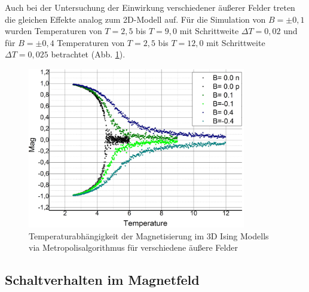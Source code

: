 Auch bei der Untersuchung der Einwirkung verschiedener äußerer Felder treten die gleichen Effekte analog zum 2D-Modell auf. Für die Simulation von $B=\pm 0,1$ wurden Temperaturen von $T=2,5$ bis $T=9,0$ mit Schrittweite $\Delta T= 0,02$ und für $B=\pm 0,4$ Temperaturen von $T=2,5$ bis $T=12,0$ mit Schrittweite $\Delta T= 0,025$ betrachtet (Abb. \ref{mp3db}).
 \begin{figure}[H]
	\centering
	\includegraphics[width=0.85\textwidth]{../Graph_Export/MP3D/m(T)_MP3D_Plot.jpg}	
	\caption{Temperaturabhängigkeit der Magnetisierung im 3D Ising Modells via Metropolisalgorithmus für verschiedene äußere Felder}
	\label{mp3db}
\end{figure}


\subsection{Schaltverhalten im Magnetfeld}
\label{auswB}

